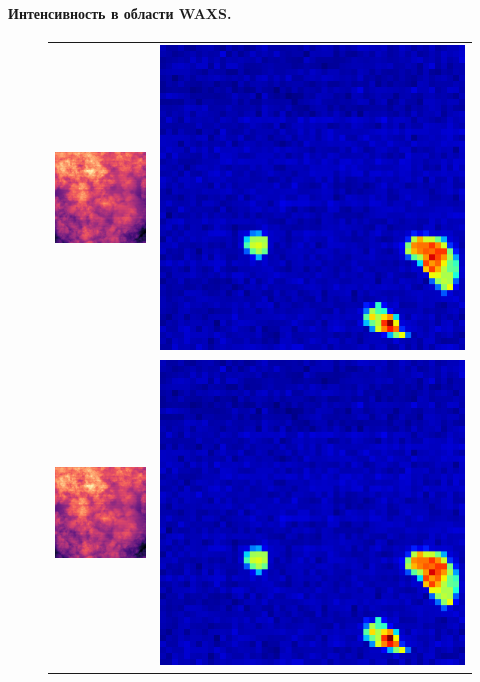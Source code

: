 	\paragraph{Интенсивность в области WAXS.}
	
	
	
		\begin{figure}[ht]\centering
\begin{tabular}{cc}
\includegraphics[width=0.5\linewidth]{fig/map-1.png}
&
\includegraphics[width=0.5\linewidth]{fig/map-2.png} \\
\includegraphics[width=0.5\linewidth]{fig/map-1.png}
&
\includegraphics[width=0.5\linewidth]{fig/map-2.png}

\end{tabular}
\end{figure}
